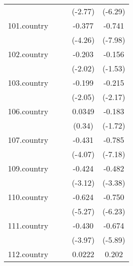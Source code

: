 {\begin{tabular}{l*{4}{c}}
            &                     &                     &     (-2.77)         &     (-6.29)         \\
[1em]
101.country &                     &                     &      -0.377\sym{***}&      -0.741\sym{***}\\
            &                     &                     &     (-4.26)         &     (-7.98)         \\
[1em]
102.country &                     &                     &      -0.203\sym{*}  &      -0.156         \\
            &                     &                     &     (-2.02)         &     (-1.53)         \\
[1em]
103.country &                     &                     &      -0.199\sym{*}  &      -0.215\sym{*}  \\
            &                     &                     &     (-2.05)         &     (-2.17)         \\
[1em]
106.country &                     &                     &      0.0349         &      -0.183         \\
            &                     &                     &      (0.34)         &     (-1.72)         \\
[1em]
107.country &                     &                     &      -0.431\sym{***}&      -0.785\sym{***}\\
            &                     &                     &     (-4.07)         &     (-7.18)         \\
[1em]
109.country &                     &                     &      -0.424\sym{**} &      -0.482\sym{***}\\
            &                     &                     &     (-3.12)         &     (-3.38)         \\
[1em]
110.country &                     &                     &      -0.624\sym{***}&      -0.750\sym{***}\\
            &                     &                     &     (-5.27)         &     (-6.23)         \\
[1em]
111.country &                     &                     &      -0.430\sym{***}&      -0.674\sym{***}\\
            &                     &                     &     (-3.97)         &     (-5.89)         \\
[1em]
112.country &                     &                     &      0.0222         &       0.202         \\

\end{tabular}}
